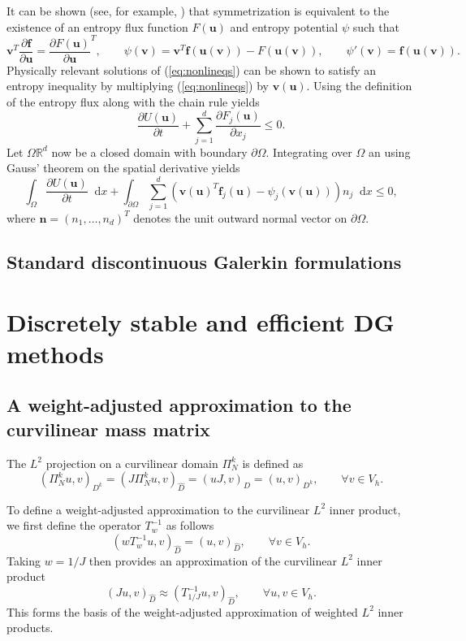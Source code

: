 \documentclass[preprint,10pt]{article}
\theoremstyle{definition}
\theoremstyle{lemma}
\theoremstyle{theorem}
\theoremstyle{assumption}
\renewcommand{\hat}{\widehat}
\newcommand{\pd}[2]{\frac{\partial#1}{\partial#2}}
\newcommand{\LRp}[1]{\left( #1 \right)}
\newcommand{\note}[1]{{\color{blue}{#1}}}
\newcommand*\diff[1]{\mathop{}\!{\mathrm{d}#1}} %
\begin{document}
It can be shown (see, for example, \cite{mock1980systems}) that symmetrization is equivalent to the existence of an entropy flux function $F(\bm{u})$ and entropy potential $\psi$ such that
\[
\bm{v}^T \pd{\bm{f}}{\bm{u}} = \pd{F(\bm{u})}{\bm{u}}^T, \qquad \psi(\bm{v}) = \bm{v}^T\bm{f}(\bm{u}(\bm{v})) - F(\bm{u}(\bm{v})), \qquad \psi'(\bm{v}) = \bm{f}(\bm{u}(\bm{v})).
\]
Physically relevant solutions of (\ref{eq:nonlineqs}) can be shown to satisfy an entropy inequality by multiplying (\ref{eq:nonlineqs}) by $\bm{v}(\bm{u})$. Using the definition of the entropy flux along with the chain rule yields 
\[
\pd{U(\bm{u})}{t} + \sum_{j=1}^d \pd{F_j(\bm{u})}{x_j} \leq 0.
\]
Let $\Omega\mathbb{R}^d$ now be a closed domain with boundary $\partial \Omega$.  Integrating over $\Omega$ an using Gauss' theorem on the spatial derivative yields
\begin{equation}
\int_{\Omega}\pd{U(\bm{u})}{t}\diff{x} + \int_{\partial \Omega} \sum_{j=1}^d \LRp{\bm{v}(\bm{u})^T\bm{f}_j(\bm{u}) - \psi_j\LRp{\bm{v}(\bm{u})}}n_j \diff{x} \leq 0,
\label{eq:entropyineq}
\end{equation}
where $\bm{n} = \LRp{n_1,\ldots,n_d}^T$ denotes the unit outward normal vector on $\partial \Omega$.  

\subsection{Standard discontinuous Galerkin formulations}


\section{Discretely stable and efficient DG methods}

\note{Discuss standard DG formulations and their disadvantages: not entropy stable due to the loss of the chain rule, and storage costs of inverting the mass matrix.  }

\subsection{A weight-adjusted approximation to the curvilinear mass matrix}

The $L^2$ projection on a curvilinear domain $\Pi_N^k$ is defined as
\[
\LRp{\Pi_N^k u,v}_{D^k} = \LRp{J \Pi_N^k u,v}_{\hat{D}} = \LRp{uJ,v}_{\hat{D}} = \LRp{u,v}_{D^k}, \qquad \forall v\in V_h.
\]


To define a weight-adjusted approximation to the curvilinear $L^2$ inner product, we first define the operator $T_{w}^{-1}$ as follows
\[
\LRp{wT_{w}^{-1} u,v}_{\hat{D}} = \LRp{ u,v}_{\hat{D}}, \qquad \forall v\in V_h.
\]
Taking $w = 1/J$ then provides an approximation of the curvilinear $L^2$ inner product
\[
\LRp{J u,v}_{\hat{D}}\approx \LRp{T_{1/J}^{-1} u,v}_{\hat{D}}, \qquad \forall u,v\in V_h.
\]
This forms the basis of the weight-adjusted approximation of weighted $L^2$ inner products.  
\end{document}

